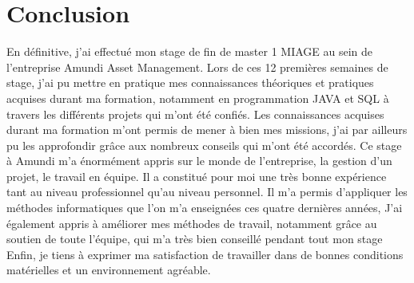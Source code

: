 \documentclass[12pt,a4paper]{report}
\begin{document}
\section{\textbf{Conclusion}}
En définitive, j'ai effectué mon stage de fin de master 1 MIAGE au sein de l'entreprise Amundi Asset Management. Lors de ces 12 premières semaines de stage, j'ai pu mettre en pratique mes connaissances théoriques et pratiques acquises durant ma formation, notamment en programmation JAVA et SQL à travers les différents projets qui m’ont été confiés. Les connaissances acquises durant ma formation m'ont permis de mener à bien mes missions, j'ai par ailleurs pu les approfondir grâce aux nombreux conseils qui m’ont été accordés. Ce stage à Amundi m’a énormément appris sur le monde de l’entreprise, la gestion d'un projet, le travail en équipe. Il a constitué pour moi une très bonne expérience tant au niveau professionnel qu’au niveau personnel. Il m’a permis d’appliquer les méthodes informatiques que l’on m’a enseignées ces quatre dernières années, J’ai également appris à améliorer mes méthodes de travail, notamment grâce au soutien de toute l’équipe, qui m’a très bien conseillé pendant tout mon stage Enfin, je tiens à exprimer ma satisfaction de travailler dans de bonnes conditions matérielles et un environnement agréable.
\end{document}
